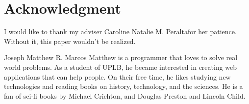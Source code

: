 \documentclass[journal]{./IEEE/IEEEtran}
\newcommand{\ADVISEE}{Joseph Matthew R. Marcos}
\newcommand{\ADVISER}{Caroline Natalie M. Peralta}
\begin{document}



\newpage
\section*{Acknowledgment}
I would like to thank my adviser \ADVISER for her patience. Without it, this paper wouldn't be realized.

\newpage

\begin{biography}{\ADVISEE}
Matthew is a programmer that loves to solve real world problems. As a student of UPLB, he became interested in creating web applications that can help people. On their free time, he likes studying new technologies and reading books on history, technology, and the sciences. He is a fan of sci-fi books by Michael Crichton, and Douglas Preston and Lincoln Child.
\end{biography}


\newpage
% 



\newpage
\appendices
\end{document}
